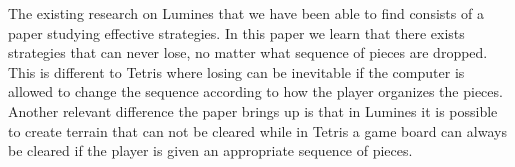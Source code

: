 The existing research on Lumines that we have been able to find consists of a paper studying effective strategies. In this paper we learn that there exists strategies that can never lose, no matter what sequence of pieces are dropped. This is different to Tetris where losing can be inevitable if the computer is allowed to change the sequence according to how the player organizes the pieces. Another relevant difference the paper brings up is that in Lumines it is possible to create terrain that can not be cleared while in Tetris a game board can always be cleared if the player is given an appropriate sequence of pieces.


